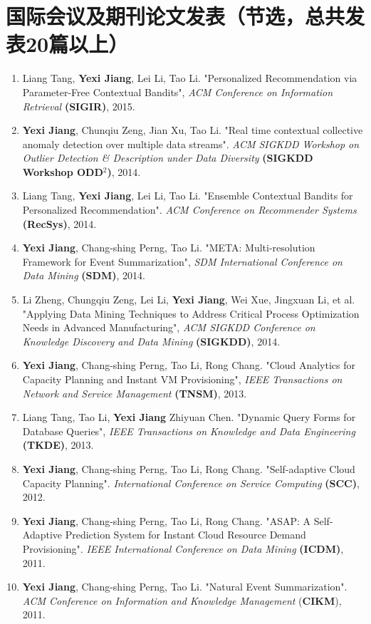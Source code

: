 \documentclass[11pt,a4paper,sans]{moderncv}
\begin{document}
\section{国际会议及期刊论文发表（节选，总共发表20篇以上）}
\begin{enumerate} \itemsep 0.05in
\item Liang Tang, \textbf{Yexi Jiang}, Lei Li, Tao Li. "Personalized Recommendation via Parameter-Free Contextual Bandits", \emph{ACM Conference on Information Retrieval} \textbf{(SIGIR)}, 2015.
\item \textbf{Yexi Jiang}, Chunqiu Zeng, Jian Xu, Tao Li. "Real time contextual collective anomaly detection over multiple data streams". \emph{ACM SIGKDD Workshop on Outlier Detection \& Description under Data Diversity} \textbf{(SIGKDD Workshop ODD$^2$)}, 2014.
\item Liang Tang, \textbf{Yexi Jiang}, Lei Li, Tao Li. "Ensemble Contextual Bandits for Personalized Recommendation". \emph{ACM Conference on Recommender Systems} \textbf{(RecSys)}, 2014.
\item \textbf{Yexi Jiang}, Chang-shing Perng, Tao Li. "META: Multi-resolution Framework for Event Summarization", \emph{SDM International Conference on Data Mining} \textbf{(SDM)}, 2014.
\item Li Zheng, Chungqiu Zeng, Lei Li, \textbf{Yexi Jiang}, Wei Xue, Jingxuan Li, et al. "Applying Data Mining Techniques to Address Critical Process Optimization Needs in Advanced Manufacturing", \emph{ACM SIGKDD Conference on Knowledge Discovery and Data Mining} \textbf{(SIGKDD)}, 2014.
\item \textbf{Yexi Jiang}, Chang-shing Perng, Tao Li, Rong Chang. "Cloud Analytics for Capacity Planning and Instant VM Provisioning", \emph{IEEE Transactions on Network and Service Management} \textbf{(TNSM)}, 2013.
\item Liang Tang, Tao Li, \textbf{Yexi Jiang} Zhiyuan Chen. "Dynamic Query Forms for Database Queries", \emph{IEEE Transactions on Knowledge and Data Engineering} \textbf{(TKDE)}, 2013. 
\item \textbf{Yexi Jiang}, Chang-shing Perng, Tao Li, Rong Chang. "Self-adaptive Cloud Capacity Planning". \emph{International Conference on Service Computing} \textbf{(SCC)}, 2012.
\item \textbf{Yexi Jiang}, Chang-shing Perng, Tao Li, Rong Chang. "ASAP: A Self-Adaptive Prediction System for Instant Cloud Resource Demand Provisioning". \emph{IEEE International Conference on Data Mining} \textbf{(ICDM)},  2011.
\item \textbf{Yexi Jiang}, Chang-shing Perng, Tao Li. "Natural Event Summarization". \emph{ACM Conference on Information and Knowledge Management }(\textbf{CIKM}), 2011.
\end{enumerate}
\end{document}
